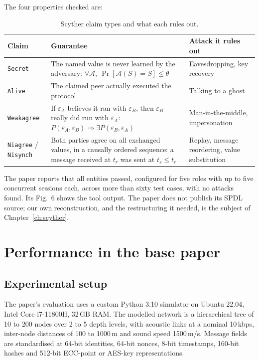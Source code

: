 The four properties checked are:

\begin{table}[H]
\centering
\caption{Scyther claim types and what each rules out.}
\label{tab:claims}
\small
\begin{tabularx}{\textwidth}{@{}L{24mm} X L{42mm}@{}}
\toprule
\textbf{Claim} & \textbf{Guarantee} & \textbf{Attack it rules out}\\
\midrule
\texttt{Secret} & The named value is never learned by the adversary:
  $\forall \mathcal{A},\ \Pr[\mathcal{A}(S)=S] \le \theta$ &
  Eavesdropping, key recovery\\
\texttt{Alive} & The claimed peer actually executed the protocol &
  Talking to a ghost\\
\texttt{Weakagree} & If $\varepsilon_A$ believes it ran with $\varepsilon_B$, then
  $\varepsilon_B$ really did run with $\varepsilon_A$:
  $P(\varepsilon_A,\varepsilon_B) \Rightarrow \exists P(\varepsilon_B,\varepsilon_A)$ &
  Man-in-the-middle, impersonation\\
\texttt{Niagree} / \texttt{Nisynch} & Both parties agree on all exchanged values, in a
  causally ordered sequence: a message received at $t_r$ was sent at $t_s \le t_r$ &
  Replay, message reordering, value substitution\\
\bottomrule
\end{tabularx}
\end{table}

The paper reports that all entities passed, configured for five roles with up to five
concurrent sessions each, across more than sixty test cases, with no attacks found. Its
Fig.~6 shows the tool output. The paper does not publish its SPDL source; our own
reconstruction, and the restructuring it needed, is the subject of Chapter~\ref{ch:scyther}.

\section{Performance in the base paper}

\subsection{Experimental setup}

The paper's evaluation uses a custom Python 3.10 simulator on Ubuntu 22.04, Intel Core
i7-11800H, 32\,GB RAM. The modelled network is a hierarchical tree of 10 to 200 nodes over 2
to 5 depth levels, with acoustic links at a nominal 10\,kbps, inter-node distances of 100 to
1000\,m and sound speed 1500\,m/s. Message fields are standardised at 64-bit identities,
64-bit nonces, 8-bit timestamps, 160-bit hashes and 512-bit ECC-point or AES-key
representations.


